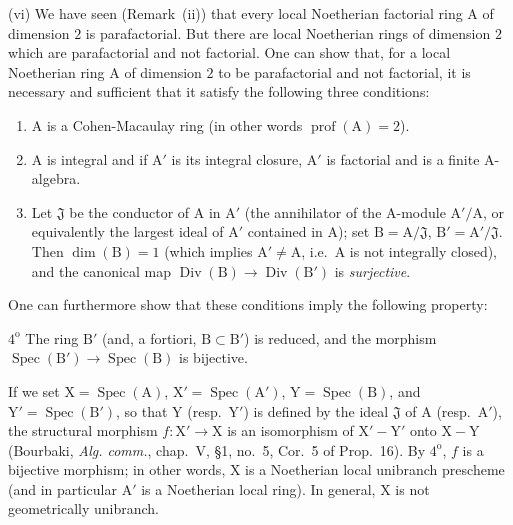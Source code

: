 \begin{env}[21.13.9]
(vi) We have seen (Remark~(ii)) that every local Noetherian factorial ring $\mathrm{A}$ of dimension $2$ is parafactorial.
But there are local Noetherian rings of dimension $2$ which are parafactorial and not factorial.
One can show that, for a local Noetherian ring $\mathrm{A}$ of dimension $2$ to be parafactorial and not factorial, it is necessary and sufficient that it satisfy the following three conditions:
\begin{enumerate}[label=\arabic*\textsuperscript{o}]
  \item $\mathrm{A}$ is a Cohen-Macaulay ring (in other words $\operatorname{prof}(\mathrm{A})=2$).
  \item $\mathrm{A}$ is integral and if $\mathrm{A}'$ is its integral closure, $\mathrm{A}'$ is factorial and is a finite A-algebra.
  \item Let $\mathfrak{J}$ be the conductor of $\mathrm{A}$ in $\mathrm{A}'$ (the annihilator of the $\mathrm{A}$-module $\mathrm{A}'/\mathrm{A}$, or equivalently the largest ideal of $\mathrm{A}'$ contained in $\mathrm{A}$); set $\mathrm{B}=\mathrm{A}/\mathfrak{J}$, $\mathrm{B}'=\mathrm{A}'/\mathfrak{J}$. Then $\dim(\mathrm{B})=1$ (which implies $\mathrm{A}'\neq\mathrm{A}$, i.e.\ $\mathrm{A}$ is not integrally closed), and the canonical map $\operatorname{Div}(\mathrm{B})\to\operatorname{Div}(\mathrm{B}')$  is \emph{surjective}.
\end{enumerate}
One can furthermore show that these conditions imply the following property:

$4^{\mathrm{o}}$ The ring $\mathrm{B}'$ (and, a fortiori, $\mathrm{B}\subset\mathrm{B}'$) is reduced, and the morphism $\operatorname{Spec}(\mathrm{B}')\to\operatorname{Spec}(\mathrm{B})$ is bijective.

If we set $\mathrm{X}=\operatorname{Spec}(\mathrm{A})$, $\mathrm{X}'=\operatorname{Spec}(\mathrm{A}')$, $\mathrm{Y}=\operatorname{Spec}(\mathrm{B})$, and $\mathrm{Y}'=\operatorname{Spec}(\mathrm{B}')$, so that $\mathrm{Y}$ (resp.\ $\mathrm{Y}'$) is defined by the ideal $\mathfrak{J}$ of $\mathrm{A}$ (resp.\ $\mathrm{A}'$), the structural morphism $f:\mathrm{X}'\to\mathrm{X}$ is an isomorphism of $\mathrm{X}'-\mathrm{Y}'$ onto $\mathrm{X}-\mathrm{Y}$ (Bourbaki, \emph{Alg. comm.}, chap.~V, \S1, no.~5, Cor.~5 of Prop.~16). By $4^{\mathrm{o}}$, $f$ is a bijective morphism; in other words, $\mathrm{X}$ is a Noetherian local unibranch prescheme  (and in particular $\mathrm{A}'$ is a Noetherian local ring). In general, $\mathrm{X}$ is not geometrically unibranch.


\end{env}
